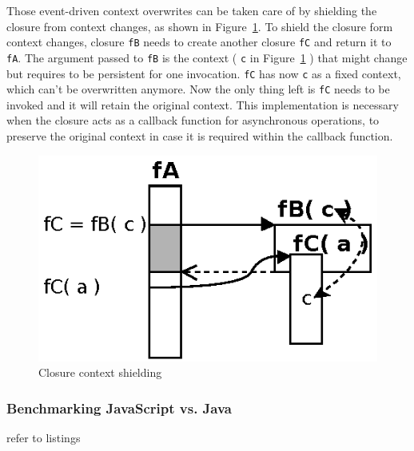 Those event-driven context overwrites can be taken care of by shielding the closure from context changes, as shown in Figure~\ref{fig:Closures_Closure-3}.
To shield the closure form context changes, closure \texttt{fB} needs to create another closure \texttt{fC} and return it to \texttt{fA}.
The argument passed to \texttt{fB} is the context ( \texttt{c} in Figure~\ref{fig:Closures_Closure-3} ) that might change but requires to be persistent for one invocation.
\texttt{fC} has now \texttt{c} as a fixed context, which can't be overwritten anymore.
Now the only thing left is \texttt{fC} needs to be invoked and it will retain the original context.
This implementation is necessary when the closure acts as a callback function for asynchronous operations, to preserve the original context in case it is required within the callback function.
\begin{figure}[!ht]
	\centering
  \includegraphics{figures/Closures_Closure-3}
	\caption{Closure context shielding}
	\label{fig:Closures_Closure-3}
\end{figure}



\subsubsection{Benchmarking JavaScript vs. Java}
refer to listings

